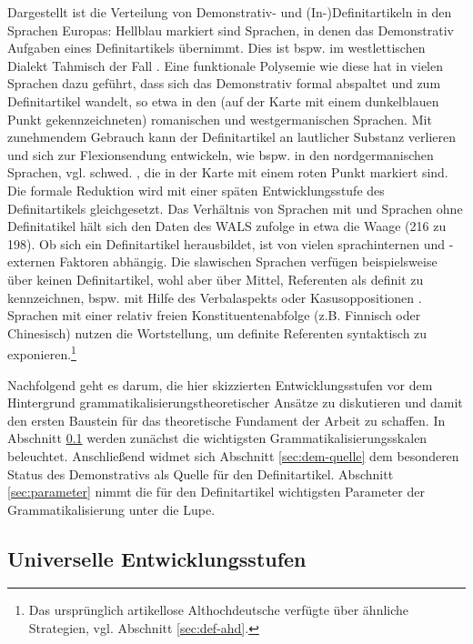 Dargestellt ist die Verteilung von Demonstrativ- und (In-)Definitartikeln in den Sprachen Europas: Hellblau markiert sind Sprachen, in denen das Demonstrativ Aufgaben eines Definitartikels übernimmt. Dies ist bspw. im westlettischen Dialekt Tahmisch der Fall \parencite[573f.]{Schroeder2006}.
Eine funktionale Polysemie wie diese hat in vielen Sprachen dazu geführt, dass sich das Demonstrativ formal abspaltet und zum  Definitartikel wandelt, so etwa in den (auf der Karte mit einem dunkelblauen Punkt gekennzeichneten) romanischen und westgermanischen Sprachen. Mit zunehmendem Gebrauch kann der Definitartikel an lautlicher Substanz 
verlieren und sich zur Flexionsendung entwickeln, wie bspw. in den  nordgermanischen Sprachen, vgl. schwed.  , die in der Karte mit einem roten Punkt markiert sind.  Die formale Reduktion wird mit einer späten Entwicklungsstufe des Definitartikels gleichgesetzt. Das Verhältnis von Sprachen mit und Sprachen ohne Definitatikel hält sich den Daten des WALS zufolge \parencite[Kapitel 37]{Dryer2013} in etwa die Waage (216 zu 198). Ob sich ein Definitartikel herausbildet, ist von vielen sprachinternen und -externen Faktoren abhängig. Die slawischen Sprachen verfügen beispielsweise über keinen Definitartikel, wohl aber über Mittel, Referenten als definit zu kennzeichnen, bspw. mit Hilfe des Verbalaspekts oder Kasusoppositionen \parencite{Hauenschild1993,Leiss2000}. Sprachen mit einer relativ freien Konstituentenabfolge (z.B. Finnisch oder Chinesisch) nutzen die Wortstellung, um definite Referenten syntaktisch zu exponieren.\footnote{
Das ursprünglich artikellose Althochdeutsche verfügte über ähnliche Strategien, vgl. Abschnitt \ref{sec:def-ahd}.}

Nachfolgend geht es darum, die hier skizzierten Entwicklungsstufen vor dem Hintergrund grammatikalisierungstheoretischer Ansätze zu diskutieren und damit den ersten Baustein für das theoretische Fundament der Arbeit zu schaffen. 
In Abschnitt \ref{sec:stufen} werden zunächst die wichtigsten Grammatikalisierungsskalen beleuchtet.  
Anschließend widmet sich Abschnitt \ref{sec:dem-quelle} dem besonderen Status des Demonstrativs als Quelle für den Definitartikel. Abschnitt \ref{sec:parameter} nimmt die für den Definitartikel wichtigsten Parameter der Grammatikalisierung unter die Lupe. 


\subsection{Universelle Entwicklungsstufen}\label{sec:stufen}

